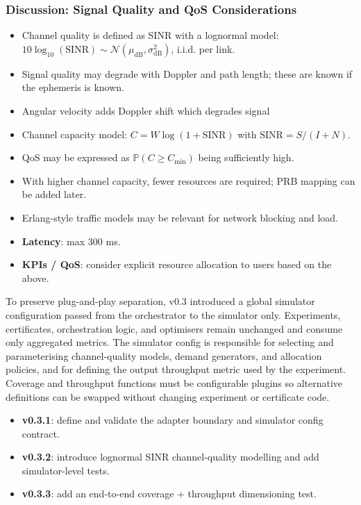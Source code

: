 \documentclass[11pt,a4paper]{article}
\begin{document}
\subsubsection{Discussion: Signal Quality and QoS Considerations}
\begin{itemize}
    \item Channel quality is defined as SINR with a lognormal model:
    $10 \log_{10}(\mathrm{SINR}) \sim \mathcal{N}(\mu_{\mathrm{dB}}, \sigma_{\mathrm{dB}}^2)$, i.i.d. per link.
    \item Signal quality may degrade with Doppler and path length; these are known if the ephemeris is known.
    \item Angular velocity adds Doppler shift which degrades signal
    \item Channel capacity model: $C = W \log(1 + \mathrm{SINR})$ with $\mathrm{SINR} = S / (I + N)$.
    \item QoS may be expressed as $\mathbb{P}(C \ge C_{\min})$ being sufficiently high.
    \item With higher channel capacity, fewer resources are required; PRB mapping can be added later.
    \item Erlang-style traffic models may be relevant for network blocking and load.
    \item \textbf{Latency}: max 300 ms.
    \item \textbf{KPIs / QoS}: consider explicit resource allocation to users based on the above.
\end{itemize}
To preserve plug-and-play separation, v0.3 introduced a global simulator configuration passed from the orchestrator to
the simulator only. Experiments, certificates, orchestration logic, and optimisers remain unchanged and consume only
aggregated metrics. The simulator config is responsible for selecting and parameterising channel-quality models, demand
generators, and allocation policies, and for defining the output throughput metric used by the experiment.
Coverage and throughput functions must be configurable plugins so alternative definitions can be swapped without
changing experiment or certificate code.
\begin{itemize}
    \item \textbf{v0.3.1}: define and validate the adapter boundary and simulator config contract.
    \item \textbf{v0.3.2}: introduce lognormal SINR channel-quality modelling and add simulator-level tests.
    \item \textbf{v0.3.3}: add an end-to-end coverage + throughput dimensioning test.
\end{itemize}
\end{document}
